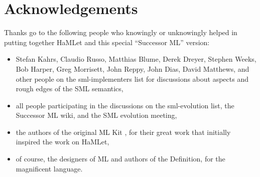 \documentclass[twoside,titlepage]{article}
\begin{document}
\section*{Acknowledgements}
\label{acknowledgements}

Thanks go to the following people who knowingly or unknowingly helped in putting together HaMLet and this special ``Successor ML'' version:

\begin{itemize}
\item Stefan Kahrs, Claudio Russo, Matthias Blume, Derek Dreyer, Stephen Weeks, Bob Harper, Greg Morrisett, John Reppy, John Dias, David Matthews, and other people on the sml-implementers list for discussions about aspects and rough edges of the SML semantics,
\item all people participating in the discussions on the sml-evolution list, the Successor ML wiki, and the SML evolution meeting,
\item the authors of the original ML Kit \cite{kit}, for their great work that initially inspired the work on HaMLet,
\item of course, the designers of ML and authors of the Definition, for the magnificent language.
\end{itemize}
\end{document}
